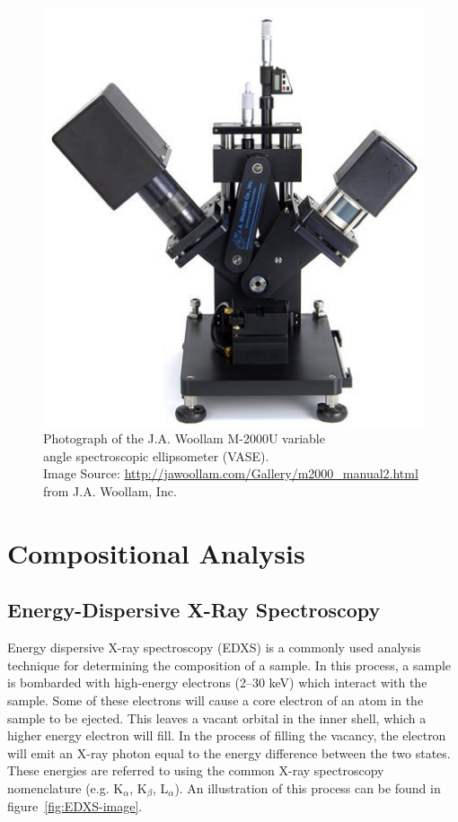 \begin{figure}[tbp]
   \centering
   \includegraphics[width=0.5\linewidth]{./figures/characterization/M2000_ellipsometer_image.png} 
   \caption[J.A. Woollam M-2000U Ellipsometer]%
   		{Photograph of the J.A. Woollam M-2000U variable \\%
   		 angle spectroscopic ellipsometer (VASE).\\%
		 {\tiny Image Source: \url{http://jawoollam.com/Gallery/m2000_manual2.html} from J.A. Woollam, Inc.%
		 \cite{woollam-web}}}
   \label{fig:M2000_image}
\end{figure}





\section{Compositional Analysis}
\label{sec:Charact-Comp}

\subsection{Energy-Dispersive X-Ray Spectroscopy}

Energy dispersive X-ray spectroscopy (EDXS) is a commonly used analysis technique for determining the composition of a sample. In this process, a sample is bombarded with high-energy electrons (2--30 keV) which interact with the sample. Some of these electrons will cause a core electron of an atom in the sample to be ejected. This leaves a vacant orbital in the inner shell, which a higher energy electron will fill. In the process of filling the vacancy, the electron will emit an X-ray photon equal to the energy difference between the two states. These energies are referred to using the common X-ray spectroscopy nomenclature (e.g. K$_{\alpha}$, K$_{\beta}$, L$_{\alpha}$). An illustration of this process can be found in figure~\vref{fig:EDXS-image}.\cite{goldstein_EDS_2003}  

